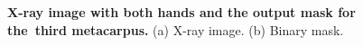 \begin{figure}[!ht]
    \centering
    \begin{subfigure}[b]{.40\textwidth}
        \caption{}\label{LP-img}
    \end{subfigure}
    \hspace{1em}
    \begin{subfigure}[b]{.40\textwidth}
        \caption{}\label{LP-mask-img}
    \end{subfigure}
     \caption{\textbf{X-ray image with both hands and the output mask for the~third metacarpus.} (a) X-ray image. (b) Binary mask.}
    \label{LP}
\end{figure}

